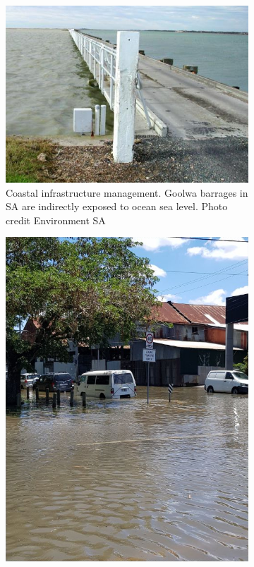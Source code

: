 \begin{figure}[H]\centering
  \begin{subfigure}[t]{\figwidthHalf}
      \includegraphics[width=\textwidth]{figures/images/goolwa_ewe_island-environment_sa_gov_au.jpg}
      \caption{Coastal infrastructure management. Goolwa barrages in SA are indirectly exposed to ocean sea level. Photo credit Environment SA }
  \end{subfigure}
  \hfill
  \begin{subfigure}[t]{\figwidthHalf}
      \includegraphics[trim={0 9cm 0 2cm},clip,width=\textwidth]{figures/images/sunnyFlood_ClarkJan2018Brisbane.png}

\end{subfigure}
\end{figure}
